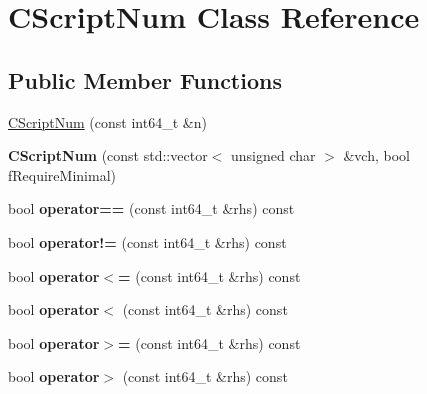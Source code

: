 \hypertarget{class_c_script_num}{}\section{C\+Script\+Num Class Reference}
\label{class_c_script_num}
\subsection*{Public Member Functions}
\begin{DoxyCompactItemize}
\item 
\mbox{\hyperlink{class_c_script_num_abd546b6e7786ba70aeeb81e218d055bc}{C\+Script\+Num}} (const int64\+\_\+t \&n)
\item 
\mbox{\label{class_c_script_num_a936fb594ed65099e7bf0dd8b2b7a237f}} 
{\bfseries C\+Script\+Num} (const std\+::vector$<$ unsigned char $>$ \&vch, bool f\+Require\+Minimal)
\item 
\mbox{\label{class_c_script_num_a5ed52a7810c9ce73d87a6017f9c43db9}} 
bool {\bfseries operator==} (const int64\+\_\+t \&rhs) const
\item 
\mbox{\label{class_c_script_num_ad2789444bdee5b9804ac456802514694}} 
bool {\bfseries operator!=} (const int64\+\_\+t \&rhs) const
\item 
\mbox{\label{class_c_script_num_aad502a509a75eabddc7a3bd3ce6013fd}} 
bool {\bfseries operator$<$=} (const int64\+\_\+t \&rhs) const
\item 
\mbox{\label{class_c_script_num_a68591f04a5967fcdfc41745d61e2c178}} 
bool {\bfseries operator$<$} (const int64\+\_\+t \&rhs) const
\item 
\mbox{\label{class_c_script_num_aa3f57625dfa70ceda94a3017efc57838}} 
bool {\bfseries operator$>$=} (const int64\+\_\+t \&rhs) const
\item 
\mbox{\label{class_c_script_num_ad92247f54bac8a6b797b2c0dc16bbd6f}} 
bool {\bfseries operator$>$} (const int64\+\_\+t \&rhs) const
\item 
\mbox{\label{class_c_script_num_a4217b9080a6cb42ff3d88da41b2c32bf}} 

\end{DoxyCompactItemize}

